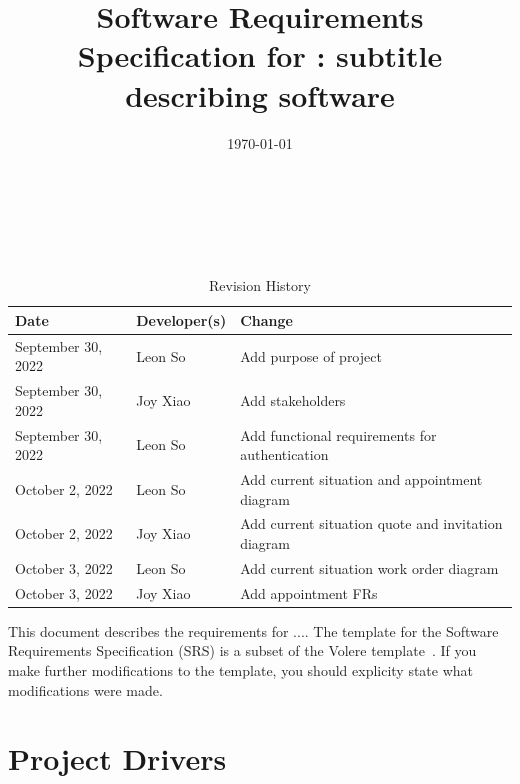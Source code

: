 \documentclass[12pt]{article}
\begin{document}
\title{Software Requirements Specification for \progname: subtitle describing software}
\author{\authname}
\date{\today}

\maketitle

~\newpage


\tableofcontents

~\newpage

\begin{table}[hp]
	\caption{Revision History} \label{TblRevisionHistory}
	\begin{tabularx}{\textwidth}{llX}
		\toprule
		\textbf{Date}      & \textbf{Developer(s)} & \textbf{Change}                                    \\
		\midrule
		September 30, 2022 & Leon So               & Add purpose of project                             \\
		September 30, 2022 & Joy Xiao              & Add stakeholders                                   \\
		September 30, 2022 & Leon So               & Add functional requirements for authentication     \\
		October 2, 2022    & Leon So               & Add current situation and appointment diagram      \\
		October 2, 2022    & Joy Xiao              & Add current situation quote and invitation diagram \\
		October 3, 2022    & Leon So               & Add current situation work order diagram           \\
		October 3, 2022    & Joy Xiao              & Add appointment FRs                                \\
		\bottomrule
	\end{tabularx}
\end{table}

\newpage


This document describes the requirements for .... The template for the Software Requirements
Specification (SRS) is a subset of the Volere template~\citep{RobertsonAndRobertson2012}. If you
make further modifications to the template, you should explicity state what modifications were
made.

\section{Project Drivers}
\end{document}
